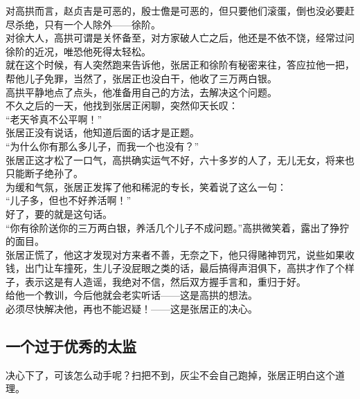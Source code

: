 \begin{multicols}{\theparacolNo}
对高拱而言，赵贞吉是可恶的，殷士儋是可恶的，但只要他们滚蛋，倒也没必要赶尽杀绝，只有一个人除外——徐阶。\\

对徐大人，高拱可谓是关怀备至，对方家破人亡之后，他还是不依不饶，经常过问徐阶的近况，唯恐他死得太轻松。\\

就在这个时候，有人突然跑来告诉他，张居正和徐阶有秘密来往，答应拉他一把，帮他儿子免罪，当然了，张居正也没白干，他收了三万两白银。\\

高拱平静地点了点头，他准备用自己的方法，去解决这个问题。\\

不久之后的一天，他找到张居正闲聊，突然仰天长叹：\\

“老天爷真不公平啊！”\\

张居正没有说话，他知道后面的话才是正题。\\

“为什么你有那么多儿子，而我一个也没有？”\\

张居正这才松了一口气，高拱确实运气不好，六十多岁的人了，无儿无女，将来也只能断子绝孙了。\\

为缓和气氛，张居正发挥了他和稀泥的专长，笑着说了这么一句：\\

“儿子多，但也不好养活啊！”\\

好了，要的就是这句话。\\

“你有徐阶送你的三万两白银，养活几个儿子不成问题。”高拱微笑着，露出了狰狞的面目。\\

张居正慌了，他这才发现对方来者不善，无奈之下，他只得赌神罚咒，说些如果收钱，出门让车撞死，生儿子没屁眼之类的话，最后搞得声泪俱下，高拱才作了个样子，表示这是有人造谣，我绝对不信，然后双方握手言和，重归于好。\\

给他一个教训，今后他就会老实听话——这是高拱的想法。\\

必须尽快解决他，再也不能迟疑！——这是张居正的决心。\\

\subsection{一个过于优秀的太监}
决心下了，可该怎么动手呢？扫把不到，灰尘不会自己跑掉，张居正明白这个道理。\\


\end{multicols}
